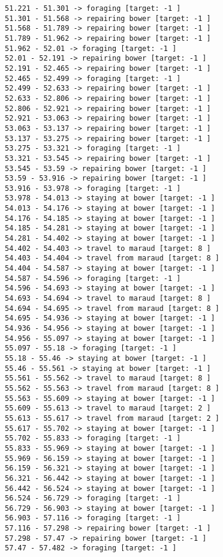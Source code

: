 \documentclass[11pt]{article}
\begin{document}
\begin{Verbatim}[commandchars=\\\{\}]
51.221 - 51.301 -> foraging [target: -1 ]
51.301 - 51.568 -> repairing bower [target: -1 ]
51.568 - 51.789 -> repairing bower [target: -1 ]
51.789 - 51.962 -> repairing bower [target: -1 ]
51.962 - 52.01 -> foraging [target: -1 ]
52.01 - 52.191 -> repairing bower [target: -1 ]
52.191 - 52.465 -> repairing bower [target: -1 ]
52.465 - 52.499 -> foraging [target: -1 ]
52.499 - 52.633 -> repairing bower [target: -1 ]
52.633 - 52.806 -> repairing bower [target: -1 ]
52.806 - 52.921 -> repairing bower [target: -1 ]
52.921 - 53.063 -> repairing bower [target: -1 ]
53.063 - 53.137 -> repairing bower [target: -1 ]
53.137 - 53.275 -> repairing bower [target: -1 ]
53.275 - 53.321 -> foraging [target: -1 ]
53.321 - 53.545 -> repairing bower [target: -1 ]
53.545 - 53.59 -> repairing bower [target: -1 ]
53.59 - 53.916 -> repairing bower [target: -1 ]
53.916 - 53.978 -> foraging [target: -1 ]
53.978 - 54.013 -> staying at bower [target: -1 ]
54.013 - 54.176 -> staying at bower [target: -1 ]
54.176 - 54.185 -> staying at bower [target: -1 ]
54.185 - 54.281 -> staying at bower [target: -1 ]
54.281 - 54.402 -> staying at bower [target: -1 ]
54.402 - 54.403 -> travel to maraud [target: 8 ]
54.403 - 54.404 -> travel from maraud [target: 8 ]
54.404 - 54.587 -> staying at bower [target: -1 ]
54.587 - 54.596 -> foraging [target: -1 ]
54.596 - 54.693 -> staying at bower [target: -1 ]
54.693 - 54.694 -> travel to maraud [target: 8 ]
54.694 - 54.695 -> travel from maraud [target: 8 ]
54.695 - 54.936 -> staying at bower [target: -1 ]
54.936 - 54.956 -> staying at bower [target: -1 ]
54.956 - 55.097 -> staying at bower [target: -1 ]
55.097 - 55.18 -> foraging [target: -1 ]
55.18 - 55.46 -> staying at bower [target: -1 ]
55.46 - 55.561 -> staying at bower [target: -1 ]
55.561 - 55.562 -> travel to maraud [target: 8 ]
55.562 - 55.563 -> travel from maraud [target: 8 ]
55.563 - 55.609 -> staying at bower [target: -1 ]
55.609 - 55.613 -> travel to maraud [target: 2 ]
55.613 - 55.617 -> travel from maraud [target: 2 ]
55.617 - 55.702 -> staying at bower [target: -1 ]
55.702 - 55.833 -> foraging [target: -1 ]
55.833 - 55.969 -> staying at bower [target: -1 ]
55.969 - 56.159 -> staying at bower [target: -1 ]
56.159 - 56.321 -> staying at bower [target: -1 ]
56.321 - 56.442 -> staying at bower [target: -1 ]
56.442 - 56.524 -> staying at bower [target: -1 ]
56.524 - 56.729 -> foraging [target: -1 ]
56.729 - 56.903 -> staying at bower [target: -1 ]
56.903 - 57.116 -> foraging [target: -1 ]
57.116 - 57.298 -> repairing bower [target: -1 ]
57.298 - 57.47 -> repairing bower [target: -1 ]
57.47 - 57.482 -> foraging [target: -1 ]

\end{Verbatim}
\end{document}
